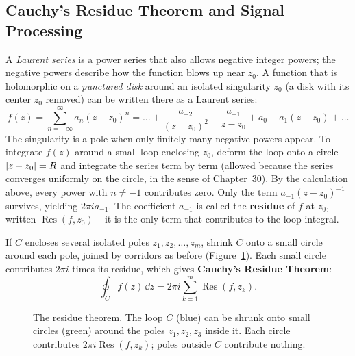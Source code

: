 \subsection{Cauchy's Residue Theorem and Signal Processing}

A \emph{Laurent series} is a power series that also allows negative integer
powers; the negative powers describe how the function blows up near $z_0$. A
function that is holomorphic on a \emph{punctured disk} around an isolated
singularity $z_0$ (a disk with its center $z_0$ removed) can be written there as a
Laurent series:
\[
f(z) = \sum_{n=-\infty}^\infty a_n (z - z_0)^n = \dots + \frac{a_{-2}}{(z-z_0)^2} + \frac{a_{-1}}{z-z_0} + a_0 + a_1(z-z_0) + \dots
\]
The singularity is a pole when only finitely many negative powers appear. To integrate $f(z)$ around a small loop enclosing $z_0$,
deform the loop onto a circle $\lvert z-z_0\rvert=R$ and integrate the series term by
term (allowed because the series converges uniformly on the circle, in the sense of Chapter~30). By the
calculation above, every power with $n\neq -1$ contributes zero. Only the term
$a_{-1}(z - z_0)^{-1}$ survives, yielding $2\pi i a_{-1}$. The coefficient $a_{-1}$ is called the \textbf{residue} of
$f$ at $z_0$, written $\operatorname{Res}(f, z_0)$ -- it is the only term that
contributes to the loop integral.

If $C$ encloses several isolated poles $z_1, z_2, \dots, z_m$, shrink $C$ onto a
small circle around each pole, joined by corridors as before
(Figure~\ref{ch35:fig-residues}). Each small circle contributes $2\pi i$ times its
residue, which gives \textbf{Cauchy's Residue Theorem}:
\begin{equation}
\oint_C f(z)\,\dd z = 2\pi i \sum_{k=1}^{m} \operatorname{Res}(f, z_k).
\label{ch35:eq-residue-theorem}
\end{equation}

\begin{figure}[htbp]
\centering
{}
\caption{The residue theorem. The loop $C$ (blue) can be shrunk onto small circles
(green) around the poles $z_1, z_2, z_3$ inside it. Each circle contributes
$2\pi i\operatorname{Res}(f,z_k)$; poles outside $C$ contribute nothing.}
\label{ch35:fig-residues}
\end{figure}

